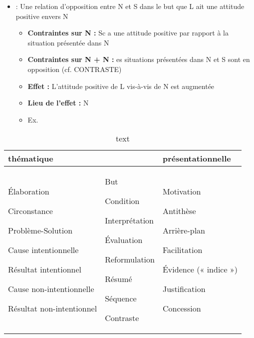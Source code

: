 \documentclass{KodeBook}
\begin{document}
\begin{itemize}
	\item {} :  Une relation d'opposition entre N et S dans le but que L ait une attitude positive envers N
	\begin{itemize}
		\item \textbf{Contraintes sur N :} Sc a une attitude positive par rapport à la situation présentée dans N
		\item \textbf{Contraintes sur N + N :} es situations présentées dans N et S sont en opposition (cf. CONTRASTE)
		\item \textbf{Effet :}  L'attitude positive de L vis-à-vis de N est augmentée
		\item \textbf{Lieu de l'effet :} N
		\item Ex. 
	\end{itemize}
\end{itemize}


\begin{table}[ht]
	\centering\small
\begin{tabular}{p{}p{}p{}}
	\hline\hline
	\textbf{thématique} && \textbf{présentationnelle}\\
	\hline
	
	Élaboration
	
	Circonstance
	
	Problème-Solution
	
	Cause intentionnelle
	
	Résultat intentionnel
	
	Cause non-intentionnelle
	
	Résultat non-intentionnel
	
	& But
	
	Condition
	
	Interprétation
	
	Évaluation
	
	Reformulation
	
	Résumé
	
	Séquence
	
	Contraste
	&
	Motivation
	
	Antithèse
	
	Arrière-plan
	
	Facilitation
	
	Évidence (« indice »)
	
	Justification
	
	Concession\\
	\hline\hline
\end{tabular}
\caption{text}
\label{tab:rst-them}
\end{table}
\end{document}
